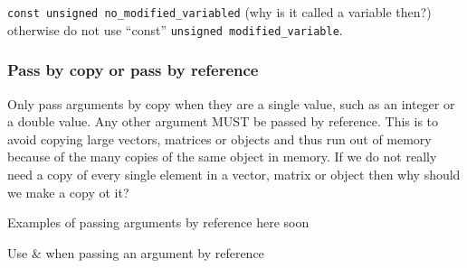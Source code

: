 \documentclass[12pt,a4paper,final]{report} %
\begin{document}
\texttt{const unsigned no\_modified\_variabled} (why is it called a
variable then?)
\\
otherwise do not use ``const'' \texttt{unsigned modified\_variable}.


\subsubsection{Pass by copy or pass by reference}
Only pass arguments by copy when they are a single value, such as an
integer or a double value. Any other argument MUST be passed by
reference. This is to avoid copying large vectors, matrices or objects
and thus run out of memory because of the many copies of the same
object in memory. If we do not really need a copy of every single
element in a vector, matrix or object then why should we make a copy
ot it?

Examples of passing arguments by reference here soon

Use \& when passing an argument by reference

\printbibliography[heading=bibintoc]
\end{document}
